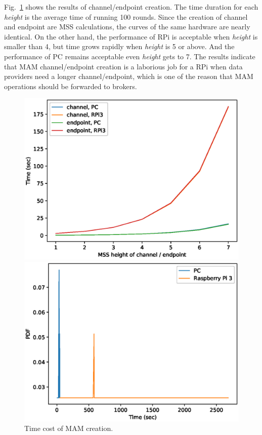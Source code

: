 \documentclass[conference]{IEEEtran}
\begin{document}
Fig.~\ref{fig:mam_create} shows the results of channel/endpoint creation. The time duration for each \textit{height} is the average time of running 100 rounds. Since the creation of channel and endpoint are MSS calculations, the curves of the same hardware are nearly identical. On the other hand, the performance of RPi is acceptable when \textit{height} is smaller than 4, but time grows rapidly when \textit{height} is 5 or above. And the performance of PC remains acceptable even \textit{height} gets to 7. The results indicate that MAM channel/endpoint creation is a laborious job for a RPi when data providers need a longer channel/endpoint, which is one of the reason that MAM operations should be forwarded to brokers.
\begin{figure}[!htb]
  \includegraphics[width=\linewidth]{mam_create}
  \caption{Time cost of MAM creation.}\label{fig:mam_create}
\endminipage\hfill
{}
  \includegraphics[width=\linewidth]{mam_send}

\end{figure}
\end{document}
